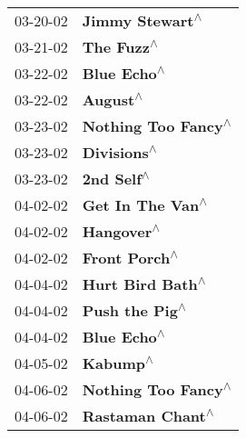 \begin{supertabular}{p{0.25\columnwidth}p{0.75\columnwidth}}
 03-20-02 &                                                            \textbf{Jimmy Stewart\textsuperscript{$\wedge$}} \\
 03-21-02 &                                                                 \textbf{The Fuzz\textsuperscript{$\wedge$}} \\
 03-22-02 &                                                                \textbf{Blue Echo\textsuperscript{$\wedge$}} \\
 03-22-02 &                                                                   \textbf{August\textsuperscript{$\wedge$}} \\
 03-23-02 &                                                        \textbf{Nothing Too Fancy\textsuperscript{$\wedge$}} \\
 03-23-02 &                                                                \textbf{Divisions\textsuperscript{$\wedge$}} \\
 03-23-02 &                                                                 \textbf{2nd Self\textsuperscript{$\wedge$}} \\
 04-02-02 &                                                           \textbf{Get In The Van\textsuperscript{$\wedge$}} \\
 04-02-02 &                                                                 \textbf{Hangover\textsuperscript{$\wedge$}} \\
 04-02-02 &                                                              \textbf{Front Porch\textsuperscript{$\wedge$}} \\
 04-04-02 &                                                           \textbf{Hurt Bird Bath\textsuperscript{$\wedge$}} \\
 04-04-02 &                                                             \textbf{Push the Pig\textsuperscript{$\wedge$}} \\
 04-04-02 &                                                                \textbf{Blue Echo\textsuperscript{$\wedge$}} \\
 04-05-02 &                                                                   \textbf{Kabump\textsuperscript{$\wedge$}} \\
 04-06-02 &                                                        \textbf{Nothing Too Fancy\textsuperscript{$\wedge$}} \\
 04-06-02 &                                                           \textbf{Rastaman Chant\textsuperscript{$\wedge$}} \\

\end{supertabular}
